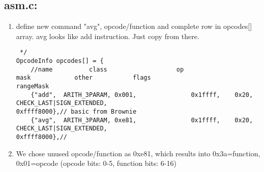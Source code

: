 \subsection{asm.c:}
\begin{enumerate}[resume]
\item define new command "avg", opcode/function and complete row in opcodes{[}{]} array. avg looks like add instruction. Just copy from there.

\begin{lstlisting}
 */
OpcodeInfo opcodes[] = {
	//name          class                   op                      mask            other           flags                                   rangeMask
	{"add",  ARITH_3PARAM, 0x001,               0x1ffff,    0x20,               CHECK_LAST|SIGN_EXTENDED,                                                       0xffff8000},// basic from Brownie
	{"avg",  ARITH_3PARAM, 0xe81,               0x1ffff,    0x20,               CHECK_LAST|SIGN_EXTENDED,                                                       0xffff8000},//
\end{lstlisting}
\item We chose unused opcode/function as 0xe81, which results into
	0x3a=function, 0x01=opcode (opcode bits: 0-5, function bits: 6-16)
\end{enumerate}
